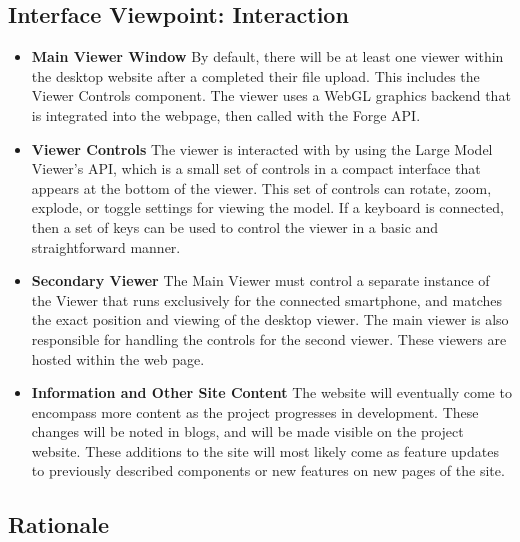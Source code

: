 \documentclass[letterpaper, 10pt, draftclsnofoot, compsoc, onecolumn]{IEEEtran}
\begin{document}
\subsection{Interface Viewpoint: Interaction}
\begin{itemize}
	\item[]\textbf{Main Viewer Window} By default, there will be at least one viewer within the desktop website after a completed their file upload. This includes the Viewer Controls component. The viewer uses a WebGL graphics backend that is integrated into the webpage, then called with the Forge API.
	\item[]\textbf{Viewer Controls} The viewer is interacted with by using the Large Model Viewer's API, which is a small set of controls in a compact interface that appears at the bottom of the viewer. This set of controls can rotate, zoom, explode, or toggle settings for viewing the model. If a keyboard is connected, then a set of keys can be used to control the viewer in a basic and straightforward manner.
	\item[]\textbf{Secondary Viewer}  The Main Viewer must control a separate instance of the Viewer that runs exclusively for the connected smartphone, and matches the exact position and viewing of the desktop viewer. The main viewer is also responsible for handling the controls for the second viewer. These viewers are hosted within the web page.

	\item[]\textbf{Information and Other Site Content} The website will eventually come to encompass more content as the project progresses in development. These changes will be noted in blogs, and will be made visible on the project website. These additions to the site will most likely come as feature updates to previously described components or new features on new pages of the site.
\end{itemize}
\subsection{Rationale}

\end{document}
